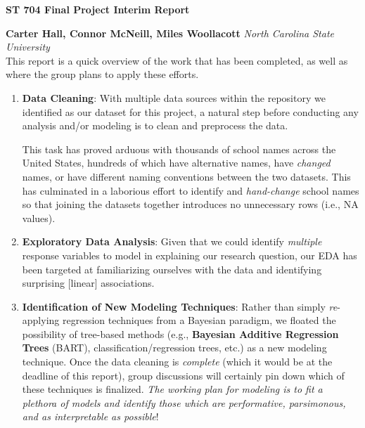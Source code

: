 \documentclass[a4paper,10pt]{article}
\begin{document}
\noindent 
\begin{center}
\textbf{{\Large ST 704 Final Project Interim Report}} \\
\end{center}

\noindent 
\textbf{Carter Hall, Connor McNeill, Miles Woollacott} \textit{North Carolina State University}
\\

\noindent
This report is a quick overview of the work that has been completed, as well as where the group plans to apply these efforts.
\begin{enumerate}
    \item \textbf{Data Cleaning}: With multiple data sources within the repository we identified as our dataset for this project, a natural step before conducting any analysis and/or modeling is to clean and preprocess the data. 

    This task has proved arduous with thousands of school names across the United States, hundreds of which have alternative names, have \textit{changed} names, or have different naming conventions between the two datasets. This has culminated in a laborious effort to identify and \textit{hand-change} school names so that joining the datasets together introduces no unnecessary rows (i.e., NA values).  
    \item \textbf{Exploratory Data Analysis}: Given that we could identify \textit{multiple} response variables to model in explaining our research question, our EDA has been targeted at familiarizing ourselves with the data and identifying surprising [linear] associations. 
    \item \textbf{Identification of New Modeling Techniques}: Rather than simply \textit{re}-applying regression techniques from a Bayesian paradigm, we floated the possibility of tree-based methods (e.g., \textbf{Bayesian Additive Regression Trees} (BART), classification/regression trees, etc.) as a new modeling technique. Once the data cleaning is \textit{complete} (which it would be at the deadline of this report), group discussions will certainly pin down which of these techniques is finalized. \textit{The working plan for modeling is to fit a plethora of models and identify those which are performative, parsimonous, and as interpretable as possible}! 
\end{enumerate}
\end{document}

